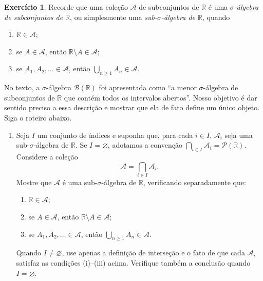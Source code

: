 \documentclass[12pt,portuguese]{article}
\theoremstyle{definition}
\theoremstyle{plainexercise}
\newtheorem{exercise}{Exercício}
\theoremstyle{starredexercise}
\theoremstyle{definition}
\begin{document}
\begin{exercise}\label{exercise:sigma-algebra-gerada}
  Recorde que uma coleção $\mathcal{A}$ de subconjuntos de $\mathbb{R}$ é uma
  \emph{$\sigma$-álgebra de subconjuntos de $\mathbb{R}$}, ou simplesmente uma
  \emph{sub-$\sigma$-álgebra de $\mathbb{R}$}, quando
  \begin{enumerate}[label=(\roman*)]
    \item $\mathbb{R} \in \mathcal{A}$;
    \item se $A \in \mathcal{A}$, então $\mathbb{R} \setminus A \in \mathcal{A}$;
    \item se $A_1, A_2, \dots \in \mathcal{A}$, então
      $\bigcup_{n \geqslant 1} A_n \in \mathcal{A}$.
  \end{enumerate}
  No texto, a $\sigma$-álgebra $\mathscr{B}(\mathbb{R})$ foi apresentada como ``a menor
  $\sigma$-álgebra de subconjuntos de $\mathbb{R}$ que contém todos os
  intervalos abertos''. Nosso objetivo é dar sentido preciso a essa descrição e
  mostrar que ela de fato define um único objeto. Siga o roteiro abaixo.

  \begin{enumerate}[label=\textbf{(\alph*)}, leftmargin=*, itemsep=0.6em]
    \item Seja $I$ um conjunto de índices e suponha que, para cada
    $i\in I$, $\mathcal{A}_i$ seja uma sub-$\sigma$-álgebra de
    $\mathbb{R}$. Se $I=\varnothing$, adotamos a convenção
    $\bigcap_{i\in I}\mathcal{A}_i=\mathscr{P}(\mathbb{R})$.
    Considere a coleção
    \[
      \mathcal{A} = \bigcap_{i \in I} \mathcal{A}_i.
    \]
    Mostre que $\mathcal{A}$ é uma sub-$\sigma$-álgebra de $\mathbb{R}$,
    verificando separadamente que:
    \begin{enumerate}[label=(\roman*)]
      \item $\mathbb{R} \in \mathcal{A}$;
      \item se $A \in \mathcal{A}$, então $\mathbb{R} \setminus A \in \mathcal{A}$;
      \item se $A_1, A_2, \dots \in \mathcal{A}$, então
        $\bigcup_{n \geqslant 1} A_n \in \mathcal{A}$.
    \end{enumerate}
    Quando $I\neq\varnothing$, use apenas a definição de interseção e
    o fato de que cada $\mathcal{A}_i$ satisfaz as condições (i)--(iii)
    acima. Verifique também a conclusão quando $I=\varnothing$.


\end{enumerate}
\end{exercise}
\end{document}
